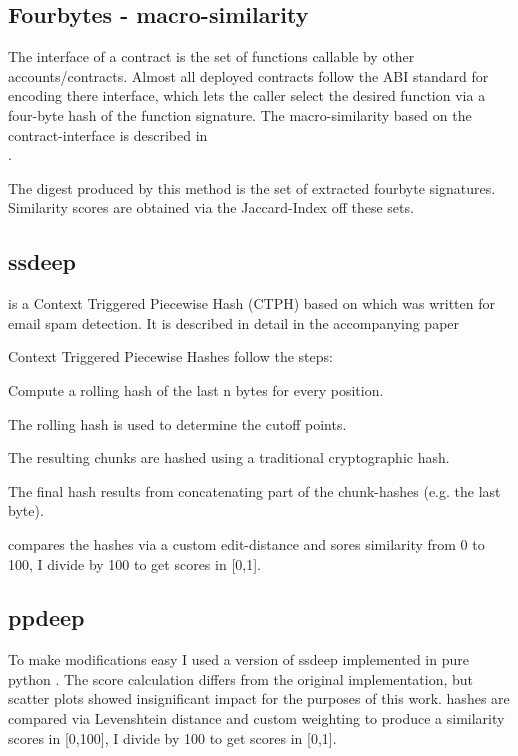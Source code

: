 \documentclass[../main.tex]{subfiles}
\begin{document}
\subsection{Fourbytes - macro-similarity \label{sec:fourbyte}}

The interface of a contract is the set of functions callable by other accounts/contracts.
Almost all deployed contracts follow the ABI standard for encoding there interface, which lets the caller select the desired function via a four-byte hash of the function signature.
The macro-similarity based on the contract-interface is described in \\.

The digest produced by this method is the set of extracted fourbyte signatures. Similarity scores are obtained via the Jaccard-Index  off these sets.

\subsection{ssdeep \label{sec:ssdeep}}
 is a Context Triggered Piecewise Hash (CTPH) based on  which was written for email spam detection. It is described in detail in the accompanying paper 

Context Triggered Piecewise Hashes follow the steps:
\begin{ol}
  \item Compute a rolling hash of the last n bytes for every position.
  \item The rolling hash is used to determine the cutoff points.
  \item The resulting chunks are hashed using a traditional cryptographic hash.
  \item The final hash results from concatenating part of the chunk-hashes (e.g. the last byte).
\end{ol}
 compares the hashes via a custom edit-distance and sores similarity from 0 to 100, I divide by 100 to get scores in [0,1].

\subsection{ppdeep \label{sec:ppdeep}}
To make modifications easy I used a version of ssdeep implemented in pure python . The score calculation differs from the original implementation, but scatter plots  showed insignificant impact for the purposes of this work.  hashes are compared via Levenshtein distance  and custom weighting to produce a similarity scores in [0,100], I divide by 100 to get scores in [0,1].
\end{document}

